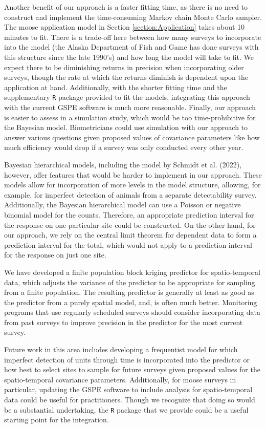 \documentclass[smallextended]{svjour3}       %
\begin{document}
Another benefit of our approach is a faster fitting time, as there is no
need to construct and implement the time-consuming Markov chain Monte
Carlo sampler. The moose application model in Section
\ref{section:Application} takes about 10 minutes to fit. There is a
trade-off here between how many surveys to incorporate into the model
(the Alaska Department of Fish and Game has done surveys with this
structure since the late 1990's) and how long the model will take to
fit. We expect there to be diminishing returns in precision when
incorporating older surveys, though the rate at which the returns
diminish is dependent upon the application at hand. Additionally, with
the shorter fitting time and the supplementary \texttt{R} package
provided to fit the models, integrating this approach with the current
GSPE software is much more reasonable. Finally, our approach is easier
to assess in a simulation study, which would be too time-prohibitive for
the Bayesian model. Biometricians could use simulation with our approach
to answer various questions given proposed values of covariance
parameters like how much efficiency would drop if a survey was only
conducted every other year.

Bayesian hierarchical models, including the model by Schmidt et al.
(2022), however, offer features that would be harder to implement in our
approach. These models allow for incorporation of more levels in the
model structure, allowing, for example, for imperfect detection of
animals from a separate detectability survey. Additionally, the Bayesian
hierarchical model can use a Poisson or negative binomial model for the
counts. Therefore, an appropriate prediction interval for the response
on one particular site could be constructed. On the other hand, for our
approach, we rely on the central limit theorem for dependent data to
form a prediction interval for the total, which would not apply to a
prediction interval for the response on just one site.

We have developed a finite population block kriging predictor for
spatio-temporal data, which adjusts the variance of the predictor to be
appropriate for sampling from a finite population. The resulting
predictor is generally at least as good as the predictor from a purely
spatial model, and, is often much better. Monitoring programs that use
regularly scheduled surveys should consider incorporating data from past
surveys to improve precision in the predictor for the most current
survey.

Future work in this area includes developing a frequentist model for
which imperfect detection of units through time is incorporated into the
predictor or how best to select sites to sample for future surveys given
proposed values for the spatio-temporal covariance parameters.
Additionally, for moose surveys in particular, updating the GSPE
software to include analysis for spatio-temporal data could be useful
for practitioners. Though we recognize that doing so would be a
substantial undertaking, the \texttt{R} package that we provide could be
a useful starting point for the integration.
\end{document}

